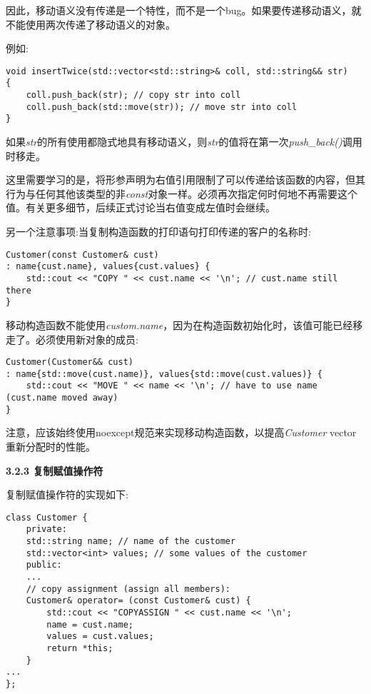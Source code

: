 因此，移动语义没有传递是一个特性，而不是一个bug。如果要传递移动语义，就不能使用两次传递了移动语义的对象。\par

例如:\par

\begin{lstlisting}[caption={}]
void insertTwice(std::vector<std::string>& coll, std::string&& str)
{
	coll.push_back(str); // copy str into coll
	coll.push_back(std::move(str)); // move str into coll
}
\end{lstlisting}

如果\textit{str}的所有使用都隐式地具有移动语义，则\textit{str}的值将在第一次\textit{push\_back()}调用时移走。\par

这里需要学习的是，将形参声明为右值引用限制了可以传递给该函数的内容，但其行为与任何其他该类型的非\textit{const}对象一样。必须再次指定何时何地不再需要这个值。有关更多细节，后续正式讨论当右值变成左值时会继续。\par

另一个注意事项:当复制构造函数的打印语句打印传递的客户的名称时:\par

\begin{lstlisting}[caption={}]
Customer(const Customer& cust)
: name{cust.name}, values{cust.values} {
	std::cout << "COPY " << cust.name << '\n'; // cust.name still there
}
\end{lstlisting}

移动构造函数不能使用\textit{custom.name}，因为在构造函数初始化时，该值可能已经移走了。必须使用新对象的成员:\par

\begin{lstlisting}[caption={}]
Customer(Customer&& cust)
: name{std::move(cust.name)}, values{std::move(cust.values)} {
	std::cout << "MOVE " << name << '\n'; // have to use name (cust.name moved away)
}
\end{lstlisting}

注意，应该始终使用noexcept规范来实现移动构造函数，以提高\textit{Customer} vector重新分配时的性能。\par

\hspace*{\fill} \par %
\textbf{3.2.3 复制赋值操作符}

复制赋值操作符的实现如下:\par

\begin{lstlisting}[caption={}]
class Customer {
	private:
	std::string name; // name of the customer
	std::vector<int> values; // some values of the customer
	public:
	...
	// copy assignment (assign all members):
	Customer& operator= (const Customer& cust) {
		std::cout << "COPYASSIGN " << cust.name << '\n';
		name = cust.name;
		values = cust.values;
		return *this;
	}
...
};
\end{lstlisting}

